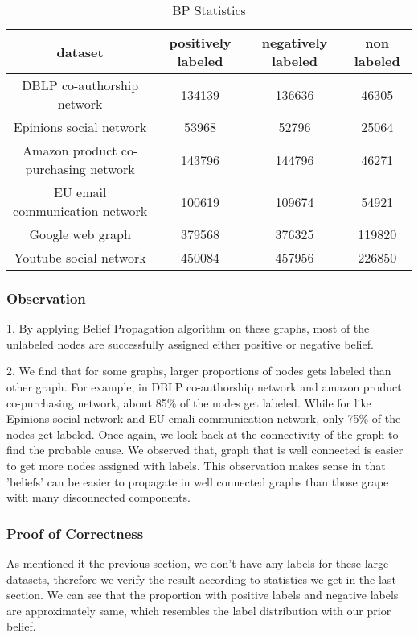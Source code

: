 \begin{table}[!htbf]
\caption{BP Statistics}
\begin{center}
\begin{tabular}{|c|c|c|c|}
\hline \hline
dataset & positively labeled & negatively labeled & non labeled  \\
\hline
DBLP co-authorship network & 134139  & 136636  & 46305 \\
Epinions social network & 53968  & 52796  & 25064 \\
Amazon product co-purchasing network & 143796 & 144796 & 46271 \\
EU email communication network & 100619 & 109674 & 54921 \\
Google web graph & 379568 & 376325 & 119820 \\
Youtube social network & 450084 & 457956 & 226850 \\
\hline
\end{tabular}
\end{center}
\label{t5:table2}
\end{table}%

 
\subsubsection{Observation}
1. By applying Belief Propagation algorithm on these graphs, most of the unlabeled nodes are successfully assigned either positive or negative belief.

2. We find that for some graphs, larger proportions of nodes gets labeled than other graph. For example, in DBLP co-authorship network and amazon product co-purchasing network,  about 85\%  of the nodes get labeled. While for like Epinions social network and EU emali communication network, only 75\% of the nodes get labeled. Once again, we look back at the connectivity of the graph to find the probable cause. We observed that, graph that is well connected is easier to get more nodes assigned with labels. This observation makes sense in that 'beliefs' can be easier to propagate in well connected graphs than those grape with many disconnected components.

\subsubsection{Proof of Correctness}
As mentioned it the previous section, we don't have any labels for these large datasets, therefore we verify the result according to statistics we get in the last section. We can see that the proportion with positive labels and negative labels are approximately same, which resembles the label distribution with our prior belief. 





